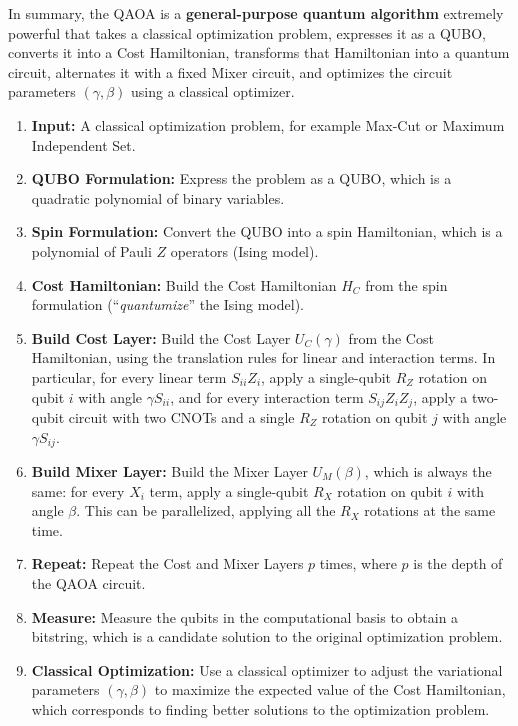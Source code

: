 \highspace
In summary, the QAOA is a \textbf{general-purpose quantum algorithm} extremely powerful that takes a classical optimization problem, expresses it as a QUBO, converts it into a Cost Hamiltonian, transforms that Hamiltonian into a quantum circuit, alternates it with a fixed Mixer circuit, and optimizes the circuit parameters $(\gamma, \beta)$ using a classical optimizer.
\begin{enumerate}
    \item \textbf{Input:} A classical optimization problem, for example Max-Cut or Maximum Independent Set.
    \item \textbf{QUBO Formulation:} Express the problem as a QUBO, which is a quadratic polynomial of binary variables.
    \item \textbf{Spin Formulation:} Convert the QUBO into a spin Hamiltonian, which is a polynomial of Pauli $Z$ operators (Ising model).
    \item \textbf{Cost Hamiltonian:} Build the Cost Hamiltonian $H_C$ from the spin formulation (``\emph{quantumize}'' the Ising model).
    \item \textbf{Build Cost Layer:} Build the Cost Layer $U_C(\gamma)$ from the Cost Hamiltonian, using the translation rules for linear and interaction terms. In particular, for every linear term $S_{ii} Z_i$, apply a single-qubit $R_Z$ rotation on qubit $i$ with angle $\gamma S_{ii}$, and for every interaction term $S_{ij} Z_i Z_j$, apply a two-qubit circuit with two CNOTs and a single $R_Z$ rotation on qubit $j$ with angle $\gamma S_{ij}$.
    \item \textbf{Build Mixer Layer:} Build the Mixer Layer $U_M(\beta)$, which is always the same: for every $X_i$ term, apply a single-qubit $R_X$ rotation on qubit $i$ with angle $\beta$. This can be parallelized, applying all the $R_X$ rotations at the same time.
    \item \textbf{Repeat:} Repeat the Cost and Mixer Layers $p$ times, where $p$ is the depth of the QAOA circuit.
    \item \textbf{Measure:} Measure the qubits in the computational basis to obtain a bitstring, which is a candidate solution to the original optimization problem.
    \item \textbf{Classical Optimization:} Use a classical optimizer to adjust the variational parameters $(\gamma, \beta)$ to maximize the expected value of the Cost Hamiltonian, which corresponds to finding better solutions to the optimization problem.
\end{enumerate}